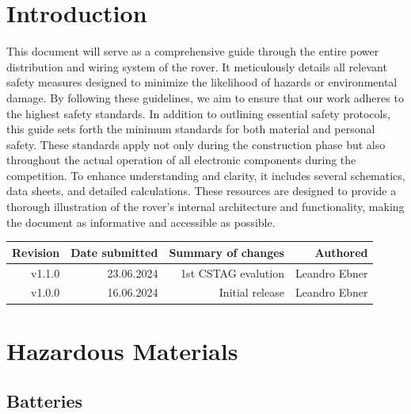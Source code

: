 \section{Introduction}

    This document will serve as a comprehensive guide through the entire power distribution and wiring system of the rover. It meticulously details all relevant safety measures designed to minimize the likelihood of hazards or environmental damage. By following these guidelines, we aim to ensure that our work adheres to the highest safety standards. In addition to outlining essential safety protocols, this guide sets forth the minimum standards for both material and personal safety. These standards apply not only during the construction phase but also throughout the actual operation of all electronic components during the competition. To enhance understanding and clarity, it includes several schematics, data sheets, and detailed calculations. These resources are designed to provide a thorough illustration of the rover's internal architecture and functionality, making the document as informative and accessible as possible.

    \begin{table}[b!] %
        \centering
        \begin{tabular}{|r|r|r|r|} \hline %
             Revision& Date submitted& Summary of changes&  Authored      \\ \hline 
             v1.1.0&   23.06.2024&     1st CSTAG evalution& Leandro Ebner \\ \hline 
             v1.0.0&   16.06.2024&     Initial release&     Leandro Ebner \\ \hline
        \end{tabular}
    \end{table}

    \clearpage %
    
\section{Hazardous Materials}

    \subsection{Batteries}
    
